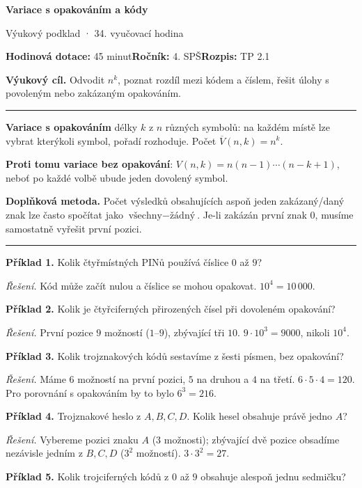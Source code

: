 \documentclass[11pt,a4paper]{article}
\newcommand{\sect}[1]{\par\vspace{2mm}{\Large\sffamily\bfseries\color{deep} #1}\par\vspace{-0.5mm}\noindent\color{teal}\rule{\linewidth}{0.7pt}\color{black}\vspace{1mm}}
\begin{document}
{\Huge\sffamily\bfseries\color{deep} Variace s opakováním a kódy}\par
{\sffamily\large\color{teal} Výukový podklad · 34. vyučovací hodina}\par
\textbf{Hodinová dotace:} 45 minut\quad \textbf{Ročník:} 4. SPŠ\quad \textbf{Rozpis:} TP 2.1\par
\begin{tcolorbox}[theobox]\textbf{Výukový cíl.} Odvodit \(n^k\), poznat rozdíl mezi kódem a číslem, řešit úlohy s povoleným nebo zakázaným opakováním.\end{tcolorbox}
\sect{Teorie a vysvětlení}
\textbf{Variace s opakováním} délky \(k\) z \(n\) různých symbolů: na každém místě lze vybrat kterýkoli symbol, pořadí rozhoduje. Počet \(\overline V(n,k)=n^k\).\par
\textbf{Proti tomu variace bez opakování}: \(V(n,k)=n(n-1)\cdots(n-k+1)\), neboť po každé volbě ubude jeden dovolený symbol.\par
\textbf{Doplňková metoda.} Počet výsledků obsahujících aspoň jeden zakázaný/daný znak lze často spočítat jako \(\text{všechny}-\text{žádný}\). Je-li zakázán první znak \(0\), musíme samostatně vyřešit první pozici.
\sect{Řešené příklady}
\textbf{Příklad 1.} Kolik čtyřmístných PINů používá číslice \(0\) až \(9\)?\par
\textit{Řešení.} Kód může začít nulou a číslice se mohou opakovat. \(10^4=10\,000\).\par\smallskip
\textbf{Příklad 2.} Kolik je čtyřciferných přirozených čísel při dovoleném opakování?\par
\textit{Řešení.} První pozice \(9\) možností (\(1\)--\(9\)), zbývající tři \(10\). \(9\cdot10^3=9000\), nikoli \(10^4\).\par\smallskip
\textbf{Příklad 3.} Kolik trojznakových kódů sestavíme z šesti písmen, bez opakování?\par
\textit{Řešení.} Máme \(6\) možností na první pozici, \(5\) na druhou a \(4\) na třetí. \(6\cdot5\cdot4=120\). Pro porovnání s opakováním by to bylo \(6^3=216\).\par\smallskip
\textbf{Příklad 4.} Trojznakové heslo z \(A,B,C,D\). Kolik hesel obsahuje právě jedno \(A\)?\par
\textit{Řešení.} Vybereme pozici znaku \(A\) (\(3\) možnosti); zbývající dvě pozice obsadíme nezávisle jedním z \(B,C,D\) (\(3^2\) možností). \(3\cdot3^2=27\).\par\smallskip
\textbf{Příklad 5.} Kolik trojciferných kódů z \(0\) až \(9\) obsahuje alespoň jednu sedmičku?\par
\end{document}
